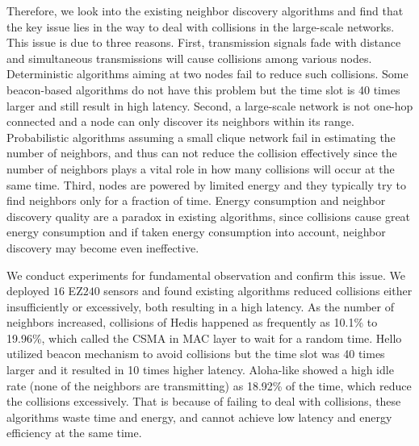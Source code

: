 Therefore, we look into the existing neighbor discovery algorithms and find that the key issue lies in the way to deal with collisions in the large-scale networks. %
This issue is due to three reasons.
First, transmission signals fade with distance and simultaneous transmissions will cause collisions among various nodes. Deterministic algorithms aiming at two nodes \cite{kandhalu2010u, chen2015heterogeneous} fail to reduce such collisions. Some beacon-based algorithms \cite{dutta2008practical, bakht2012searchlight, sun2014hello, qiu2016talk} do not have this problem but the time slot is 40 times larger \cite{kandhalu2010u} and still result in high latency. 
Second, a large-scale network is not one-hop connected and a node can only discover its neighbors within its range. Probabilistic algorithms \cite{vasudevan2009neighbor, you2011aloha, song2014probabilistic} assuming a small clique network fail in estimating the number of neighbors, and thus can not reduce the collision effectively since the number of neighbors plays a vital role in how many collisions will occur at the same time. 
Third, nodes are powered by limited energy and they typically try to find neighbors only for a fraction of time. Energy consumption and neighbor discovery quality are a paradox in existing algorithms, since collisions cause great energy consumption and if taken energy consumption into account, neighbor discovery may become even ineffective.

We conduct experiments for fundamental observation and confirm this issue. We deployed $16$ EZ$240$ sensors \cite{huang2012easipled} and found existing algorithms reduced collisions either insufficiently or excessively, both resulting in a high latency.
As the number of neighbors increased, collisions of Hedis \cite{chen2015heterogeneous} happened as frequently as 10.1\% to 19.96\%, which called the CSMA \cite{bianchi1996performance} in MAC layer to wait for a random time. Hello \cite{sun2014hello} utilized beacon mechanism to avoid collisions but the time slot was 40 times larger and it resulted in 10 times higher latency.  Aloha-like \cite{you2011aloha} showed a high idle rate (none of the neighbors are transmitting) as 18.92\% of the time, which reduce the collisions excessively.  %
That is because of failing to deal with collisions, these algorithms waste time and energy, and cannot achieve low latency and energy efficiency at the same time.

